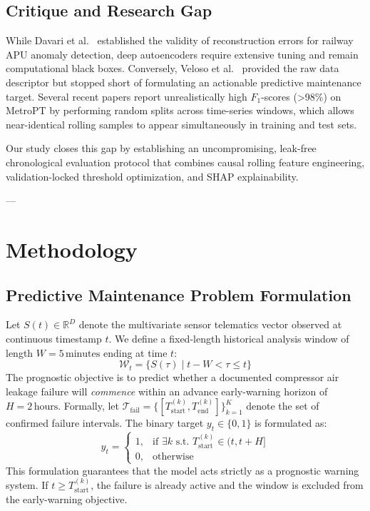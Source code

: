 \documentclass[10pt,twocolumn,a4paper]{article}
\begin{document}
\subsection{Critique and Research Gap}
While Davari et al.~\cite{davari2021predictive} established the validity of reconstruction errors for railway APU anomaly detection, deep autoencoders require extensive tuning and remain computational black boxes. Conversely, Veloso et al.~\cite{veloso2022metropt} provided the raw data descriptor but stopped short of formulating an actionable predictive maintenance target. Several recent papers report unrealistically high $F_1$-scores (>98\%) on MetroPT by performing random splits across time-series windows, which allows near-identical rolling samples to appear simultaneously in training and test sets. 

Our study closes this gap by establishing an uncompromising, leak-free chronological evaluation protocol that combines causal rolling feature engineering, validation-locked threshold optimization, and SHAP explainability.

---

\section{Methodology}

\subsection{Predictive Maintenance Problem Formulation}
Let $S(t) \in \mathbb{R}^{D}$ denote the multivariate sensor telematics vector observed at continuous timestamp $t$. We define a fixed-length historical analysis window of length $W = 5\,\text{minutes}$ ending at time $t$:
\begin{equation}
\mathcal{W}_t = \{ S(\tau) \mid t - W < \tau \le t \}
\end{equation}
The prognostic objective is to predict whether a documented compressor air leakage failure will \textit{commence} within an advance early-warning horizon of $H = 2\,\text{hours}$. Formally, let $\mathcal{T}_{\text{fail}} = \{ [T_{\text{start}}^{(k)}, T_{\text{end}}^{(k)}] \}_{k=1}^{K}$ denote the set of confirmed failure intervals. The binary target $y_t \in \{0, 1\}$ is formulated as:
\begin{equation}
y_t = \begin{cases} 
1, & \text{if } \exists k \text{ s.t. } T_{\text{start}}^{(k)} \in (t, t + H] \\
0, & \text{otherwise}
\end{cases}
\end{equation}
This formulation guarantees that the model acts strictly as a prognostic warning system. If $t \ge T_{\text{start}}^{(k)}$, the failure is already active and the window is excluded from the early-warning objective.
\end{document}
